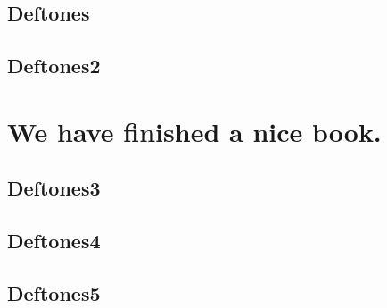 \documentclass[12pt,]{krantz}
\theoremstyle{definition}
\theoremstyle{definition}
\theoremstyle{definition}
\theoremstyle{remark}
\begin{document}
\hypertarget{deftones}{%
\section{Deftones}\label{deftones}}

\hypertarget{deftones2}{%
\section{Deftones2}\label{deftones2}}

\hypertarget{we-have-finished-a-nice-book.}{%
\chapter{We have finished a nice book.}\label{we-have-finished-a-nice-book.}}

\hypertarget{deftones3}{%
\section{Deftones3}\label{deftones3}}

\hypertarget{deftones4}{%
\section{Deftones4}\label{deftones4}}

\hypertarget{deftones5}{%
\section{Deftones5}\label{deftones5}}



\printindex
\end{document}

